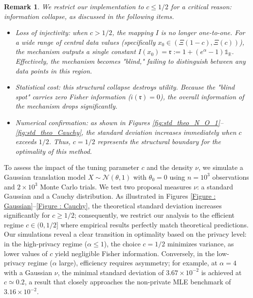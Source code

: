 \documentclass[a4paper, 11pt]{article}
\newtheorem{rem}{Remark}
\theoremstyle{definition}
\newcommand{\indi}[1]{\mathds{1}_{#1}}
\begin{document}
{\begin{rem}
    We restrict our implementation to $c \le 1/2$ for a critical reason: information collapse, as discussed in the following items.
    \begin{itemize}
        \item Loss of injectivity: when $c > 1/2$, the mapping $I$ is no longer one-to-one. For a wide range of central data values (specifically $x_0 \in (\Xi(1-c),\Xi(c))$), the mechanism outputs a single constant $I(x_0) = \mathfrak{r} := 1+(e^\alpha-1) \indi{\mathbb{R}}$. Effectively, the mechanism becomes "blind," failing to distinguish between any data points in this region.
        \item Statistical cost: this structural collapse destroys utility. Because the "blind spot" carries zero Fisher information ($i(\mathfrak{r})=0$), the overall information of the mechanism drops significantly.
        \item Numerical confirmation: as shown in Figures \ref{fig:std_theo_N_O_1}--\ref{fig:std_theo_Cauchy}, the standard deviation increases immediately when $c$ exceeds $1/2$. Thus, $c=1/2$ represents the structural boundary for the optimality of this method.
    \end{itemize}
\end{rem}










To assess the impact of the tuning parameter $c$ and the density $\nu$, we simulate a Gaussian translation model $X\sim\mathcal{N}(\theta,1)$ with $\theta_0=0$ using $n=10^3$ observations and $2 \times 10^3$ Monte Carlo trials. We test two proposal measures $\nu$: a standard Gaussian and a Cauchy distribution. As illustrated in Figures \ref{Figure : Gaussian}--\ref{Figure : Cauchy}, the theoretical standard deviation increases significantly for $c \ge 1/2$; consequently, we restrict our analysis to the efficient regime $c \in (0, 1/2]$ where empirical results perfectly match theoretical predictions. Our simulations reveal a clear transition in optimality based on the privacy level: in the high-privacy regime ($\alpha \le 1$), the choice $c=1/2$ minimizes variance, as lower values of $c$ yield negligible Fisher information. Conversely, in the low-privacy regime ($\alpha$ large), efficiency requires asymmetry; for example, at $\alpha=4$ with a Gaussian $\nu$, the minimal standard deviation of $3.67 \times 10^{-2}$ is achieved at $c \simeq 0.2$, a result that closely approaches the non-private MLE benchmark of $3.16 \times 10^{-2}$.
 


}
\end{document}
